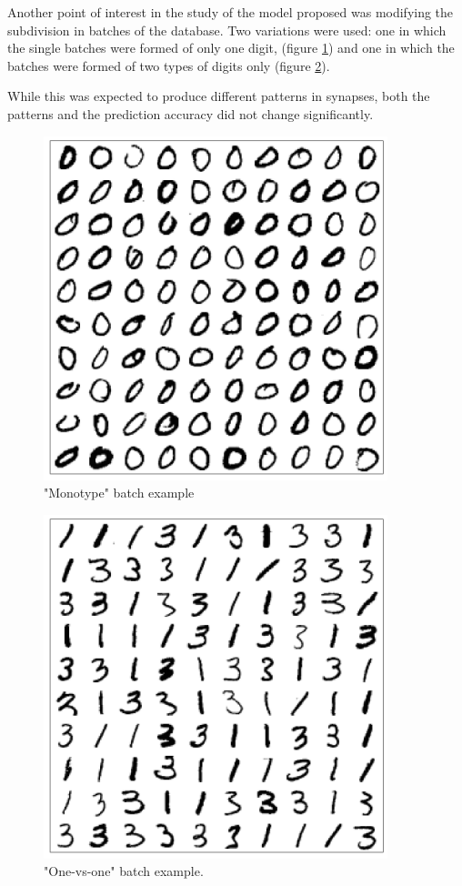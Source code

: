 \documentclass[a4paper]{report}
\begin{document}
Another point of interest in the study of the model proposed was modifying the subdivision in batches of the database.
Two variations were used:
one in which the single batches were formed of only one digit, (figure \ref{monotype}) and one in which the batches were formed of two types of digits only (figure \ref{1v1}).

While this was expected to produce different patterns in synapses, both the patterns and the prediction accuracy did not change significantly.

\begin{figure} [H]
    \centering
    \includegraphics [width=10cm ] {o/0.png}
    \caption{"Monotype" batch example}
    \label{monotype}
\end{figure}

\begin{figure} [H]
    \centering
    \includegraphics [width=10cm ] {o/31.png}
    \caption{"One-vs-one" batch example.}
    \label{1v1}
\end{figure}
\end{document}
